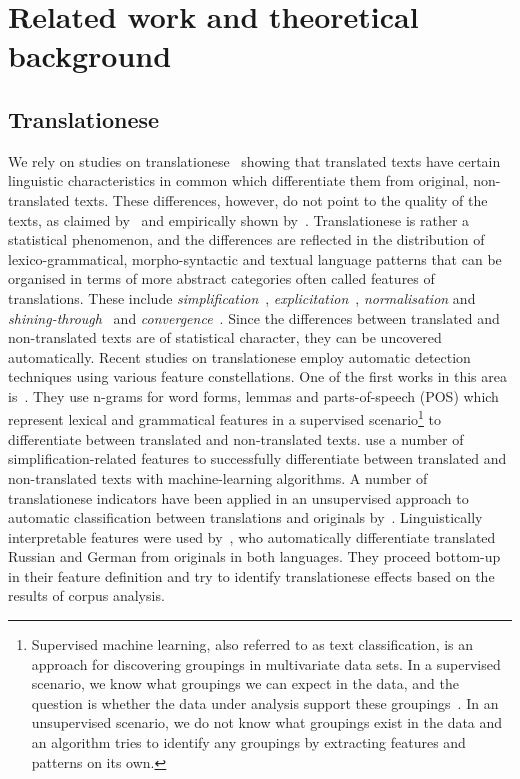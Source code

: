 \documentclass[output=paper,colorlinks,citecolor=brown]{langscibook}
\begin{document}
\largerpage
\section{Related work and theoretical background}\label{sec:relatedwork}
\subsection{Translationese}\label{ssec:translationese}
We rely on studies on translationese~\citep[among numerous others]{baker93,Toury1995,BernardiniFerraresi2011,Teich2003} showing that
translated texts have certain linguistic characteristics in common which differentiate them from original, non-translated texts. These differences, however, do not point to the quality of the texts, as claimed by~\citet{Gellerstam1986} and empirically shown by~\citet{KunilovskayaLapshinova2019}. Translationese is rather a statistical phenomenon, and the differences are reflected in the distribution of lexico-gram\-mat\-i\-cal, morpho-syntactic and textual language patterns that can be organised in terms of more abstract categories often called features of translations. %
These include \textit{simplification}~\citep{Toury1995}, \textit{explicitation}~\citep{OlohanBaker2000,Oeveras1998}, \textit{normalisation} and \textit{shining-through}~\citep{BernardiniFerraresi2011,Teich2003,Scott1998} and \textit{convergence}~\citep{Laviosa2002}. Since the differences between translated and non-translated texts are %
of statistical character, they can be uncovered automatically. Recent studies on translationese employ automatic detection techniques using various feature constellations. One of the first works in this area is~\citep{baroni2006mltranslationese}. They use n-grams for word forms, lemmas and parts-of-speech (POS) which represent %
lexical and grammatical features in a supervised scenario\footnote{Supervised machine learning, also referred to as text classification, is an approach for discovering groupings in multivariate data sets. In a supervised scenario, we know what groupings we can expect in the data, and the question is whether the data
under analysis support these groupings~\citep[see][p. 118]{Baayen2008}. In an unsupervised scenario, we do not know what groupings exist in the data and an algorithm tries to identify any groupings by extracting features and patterns on its own.} to differentiate between translated and non-translated texts. \citet{IliseiEtAl2010} use a number of simplification-related features to successfully differentiate between translated and non-translated texts with machine-learning algorithms. A number of translationese indicators have been applied in an unsupervised approach to automatic classification between translations and originals by~\citet{Volansky2015features}. Linguistically interpretable features were used by~\citet{KunilovskayaLapshinova2020}, who automatically differentiate translated Russian and German from originals in both languages. They proceed bottom-up in their feature definition and try to identify translationese effects based on the results of corpus analysis.
\end{document}
